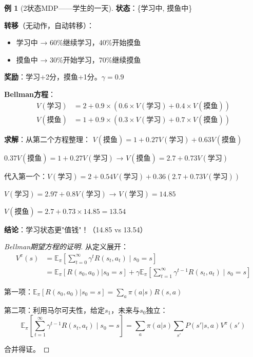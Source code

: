 \documentclass[11pt,a4paper]{article}
\theoremstyle{definition}
\newtheorem{example}{例}[section]
\begin{document}
\begin{example}[2状态MDP——学生的一天]
\textbf{状态}：\{学习中, 摸鱼中\}

\textbf{转移}（无动作，自动转移）：
\begin{itemize}
    \item 学习中 → 60\%继续学习，40\%开始摸鱼
    \item 摸鱼中 → 30\%开始学习，70\%继续摸鱼
\end{itemize}

\textbf{奖励}：学习+2分，摸鱼+1分。\textbf{$\gamma = 0.9$}

\textbf{Bellman方程}：
\begin{align*}
V(\text{学习}) &= 2 + 0.9 \times (0.6 \times V(\text{学习}) + 0.4 \times V(\text{摸鱼})) \\
V(\text{摸鱼}) &= 1 + 0.9 \times (0.3 \times V(\text{学习}) + 0.7 \times V(\text{摸鱼}))
\end{align*}

\textbf{求解}：从第二个方程整理：
$V(\text{摸鱼}) = 1 + 0.27 V(\text{学习}) + 0.63 V(\text{摸鱼})$

$0.37 V(\text{摸鱼}) = 1 + 0.27 V(\text{学习})$ → $V(\text{摸鱼}) = 2.7 + 0.73 V(\text{学习})$

代入第一个：$V(\text{学习}) = 2 + 0.54 V(\text{学习}) + 0.36(2.7 + 0.73 V(\text{学习}))$

$V(\text{学习}) = 2.97 + 0.8 V(\text{学习})$ → $V(\text{学习}) = 14.85$

$V(\text{摸鱼}) = 2.7 + 0.73 \times 14.85 = 13.54$

\textbf{结论}：学习状态更"值钱"！（14.85 vs 13.54）
\end{example}

\begin{proof}[Bellman期望方程的证明]
从定义展开：
\begin{align*}
V^\pi(s) &= \mathbb{E}_\pi\left[\sum_{t=0}^\infty \gamma^t R(s_t, a_t) \mid s_0 = s\right] \\
&= \mathbb{E}_\pi[R(s_0, a_0) | s_0 = s] + \gamma \mathbb{E}_\pi\left[\sum_{t=1}^\infty \gamma^{t-1} R(s_t, a_t) \mid s_0 = s\right]
\end{align*}

第一项：$\mathbb{E}_\pi[R(s_0, a_0) | s_0 = s] = \sum_a \pi(a|s) R(s,a)$

第二项：利用马尔可夫性，给定$s_1$，未来与$s_0$独立：
\[
\mathbb{E}_\pi\left[\sum_{t=1}^\infty \gamma^{t-1} R(s_t, a_t) \mid s_0 = s\right] = \sum_a \pi(a|s) \sum_{s'} P(s'|s,a) V^\pi(s')
\]

合并得证。
\end{proof}
\end{document}
